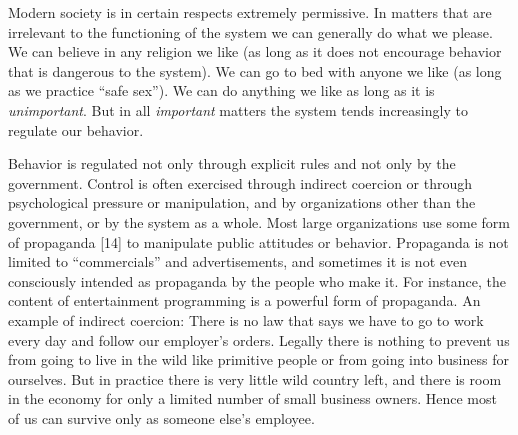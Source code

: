 
\showgrid

 Modern society is in certain respects extremely permissive. In matters that are irrelevant to the functioning of the system we can generally do what we please. We can believe in any religion we like (as long as it does not encourage behavior that is dangerous to the system). We can go to bed with anyone we like (as long as we practice “safe sex”). We can do anything we like as long as it is {\em unimportant}. But in all {\em important} matters
 the system tends increasingly to regulate our behavior.

 Behavior is regulated not only through explicit rules and not only by the government. Control is often exercised through indirect coercion or through psychological pressure or manipulation, and by organizations other than the government, or by the system as a whole. Most large organizations use some form of propaganda [14] to manipulate public attitudes or behavior. Propaganda is not limited to “commercials” and advertisements, and sometimes it is not even consciously intended as propaganda by the people who make it. For instance, the content of entertainment programming is a powerful form of propaganda. An example of indirect coercion: There is no law that says we have to go to work every day and follow our employer’s orders. Legally there is nothing to prevent us from going to live in the wild like primitive people or from going into business for ourselves. But in practice there is very little wild country left, and there is room in the economy for only a limited number of small business owners. Hence most of us can survive only as someone else’s employee.
